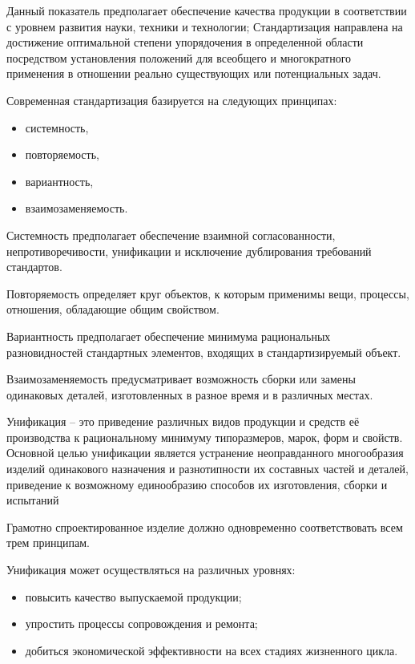 Данный показатель предполагает обеспечение качества продукции в
соответствии с уровнем развития науки, техники и технологии;
Стандартизация направлена на достижение оптимальной степени
упорядочения в определенной области посредством установления положений
для всеобщего и многократного применения в отношении реально
существующих или потенциальных задач.

Современная стандартизация базируется на следующих принципах:
\begin{itemize}
\item системность,  
\item повторяемость, 
\item вариантность,
\item  взаимозаменяемость.
\end{itemize}

Системность предполагает обеспечение взаимной согласованности,
непротиворечивости, унификации и исключение дублирования требований
стандартов.

Повторяемость определяет круг объектов, к которым применимы вещи,
процессы, отношения, обладающие общим свойством.

Вариантность предполагает обеспечение минимума рациональных
разновидностей стандартных элементов, входящих в стандартизируемый
объект.

Взаимозаменяемость предусматривает возможность сборки или замены
одинаковых деталей, изготовленных в разное время и в различных местах.

Унификация – это приведение различных видов продукции и средств её
производства к рациональному минимуму типоразмеров, марок, форм и
свойств. Основной целью унификации является устранение неоправданного
многообразия изделий одинакового назначения и разнотипности их
составных частей и деталей, приведение к возможному единообразию
способов их изготовления, сборки и испытаний~\cite{Lanin2019}

Грамотно спроектированное изделие должно одновременно соответствовать
всем трем принципам.

Унификация может осуществляться на различных уровнях:
\begin{itemize}
\item повысить качество выпускаемой продукции;
\item упростить процессы сопровождения и ремонта;
\item добиться экономической эффективности на всех стадиях жизненного цикла.
\end{itemize}

